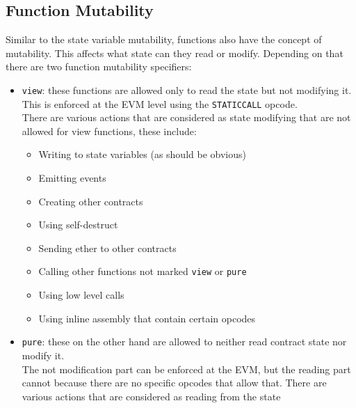 \subsection*{Function Mutability}

Similar to the state variable mutability, functions also have the concept of mutability.
This affects what state can they read or modify.
Depending on that there are two function mutability specifiers:

\begin{itemize}

   \item\texttt{view}: these functions are allowed only to read the state but not modifying it.
   This is enforced at the EVM level using the \texttt{STATICCALL} opcode.\\

   There are various actions that are considered as state modifying that are not allowed for view functions, these include:
   
   \begin{itemize}
      
      \item Writing to state variables (as should be obvious)
      
      \item Emitting events
      
      \item Creating other contracts
      
      \item Using self-destruct
      
      \item Sending ether to other contracts
      
      \item Calling other functions not marked \texttt{view} or \texttt{pure}
      
      \item Using low level calls
      
      \item Using inline assembly that contain certain opcodes
   
   \end{itemize}

   \item\texttt{pure}: these on the other hand are allowed to neither read contract state nor modify it.\\

   The not modification part can be enforced at the EVM, but the reading part cannot because there are no specific opcodes that allow that.
   There are various actions that are considered as reading from the state


\end{itemize}
